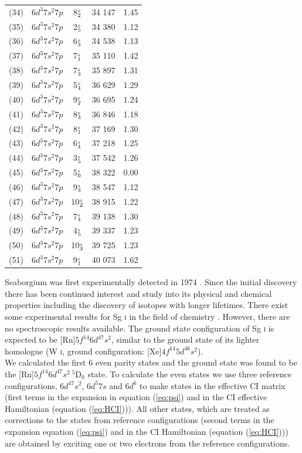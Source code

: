 \documentclass[10pt,a4paper, twoside, openright]{report}
\begin{document}
{\begin{longtable}{cl@{\hspace{0.5cm}}c@{\hspace{0.5cm}}r@{\hspace{0.5cm}}r}
(34) & $6d^3 7s^2 7p$  & 8$_2^{\rm_o}$  & 34 147 & 1.45 \\
(35) & $6d^3 7s^2 7p$  &  2$_{5}^{\rm_o}$ & 34 380 & 1.12  \\  
(36) & $6d^3 7s^2 7p$  & 6$_3^{\rm_o}$  & 34 538 & 1.13  \\
(37) & $6d^3 7s^2 7p$  & 7$_1^{\rm_o}$  & 35 110 & 1.42 \\
(38) & $6d^3 7s^2 7p$  & 7$_3^{\rm_o}$  & 35 897 & 1.31  \\
(39) & $6d^3 7s^2 7p$  &  5$_4^{\rm_o}$ & 36 629 & 1.29  \\
(40) & $6d^3 7s^2 7p$  & 9$_2^{\rm_o}$  & 36 695 & 1.24 \\
(41) & $6d^3 7s^2 7p$ & 8$_3^{\rm_o}$  & 36 846 & 1.18 \\
(42) & $6d^3 7s^2 7p$  & 8$_1^{\rm_o}$  & 37 169 & 1.30 \\
(43) & $6d^3 7s^2 7p$  &  6$_4^{\rm_o}$& 37 218 & 1.25 \\
(44) & $6d^3 7s^2 7p$  &  3$_{5}^{\rm_o}$ & 37 542 & 1.26 \\
(45) & $6d^3 7s^2 7p$  &  5$_0^{\rm_o}$  & 38 322 & 0.00 \\ 
(46) & $6d^3 7s^2 7p$  & 9$_3^{\rm_o}$  & 38 547 & 1.12 \\ 
(47) & $6d^3 7s^2 7p$  & 10$_2^{\rm_o}$  & 38 915 & 1.22 \\ 
(48) & $6d^3 7s^2 7p$  &  7$_4^{\rm_o}$ & 39 138 & 1.30 \\
(49) & $6d^3 7s^2 7p$  &  4$_{5}^{\rm_o}$ & 39 337 & 1.23 \\
(50) & $6d^3 7s^2 7p$  & 10$_3^{\rm_o}$  & 39 725 & 1.23 \\
(51) & $6d^3 7s^2 7p$  & 9$_1^{\rm_o}$  & 40 073 & 1.62 \\ 
  \bottomrule
 \bottomrule
 \end{longtable} 
 }
Seaborgium was first experimentally detected in 1974 \cite{Ghoirso1974}. Since the initial discovery there has been continued interest and study into its physical and chemical properties including the discovery of isotopes with longer lifetimes. There exist some experimental results for Sg \textsc{i} in the field of chemistry \cite{Schadel2012}. However, there are no spectroscopic results available.   The ground state configuration of Sg \textsc{i} is expected to be [Rn]$5f^{14}6d^47s^2$, similar to the ground state of its lighter homologue (W \textsc{i}, ground configuration:  [Xe]$4f^{14}5d^46s^2$). \\
\linebreak
We calculated the first 6 even parity states and the ground state was found  to be the [Rn]$5f^{14}6d^47s^2 \ ^5$D$_0$ state. To calculate the even states we use three reference configurations, $6d^47s^2$, $6d^5 7s$ and $6d^6$ to make states in the effective CI matrix (first terms in the expansion in equation (\ref{eq:psi}) and in the CI effective Hamiltonian (equation (\ref{eq:HCI}))). All other states, which are treated as corrections to the states from reference configurations (second terms in the expansion equation (\ref{eq:psi}) and in the CI Hamiltonian (equation (\ref{eq:HCI}))) are obtained by exciting one or two electrons from the reference configurations.
\end{document}
